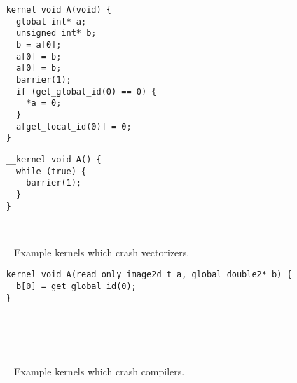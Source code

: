 \newsavebox{\XeonPhiSegfault}
\begin{lrbox}{\XeonPhiSegfault}
  \hspace{1.5em}
  \begin{lstlisting}
    kernel void A(void) {
      global int* a;
      unsigned int* b;
      b = a[0];
      a[0] = b;
      a[0] = b;
      barrier(1);
      if (get_global_id(0) == 0) {
        *a = 0;
      }
      a[get_local_id(0)] = 0;
    }
  \end{lstlisting}
\end{lrbox}


\newsavebox{\IntelVectorizerSegfault}
\begin{lrbox}{\IntelVectorizerSegfault}
  \hspace{1.5em}
  \begin{lstlisting}
    __kernel void A() {
      while (true) {
        barrier(1);
      }
    }
  \end{lstlisting}
\end{lrbox}

\begin{figure}
  \centering
  \\%
  \caption{Example kernels which crash vectorizers.}%
  \label{lst:vectorizer-crashes}%
\end{figure}

\newsavebox{\IntelGtDoubleAssertion}
\begin{lrbox}{\IntelGtDoubleAssertion}
  \hspace{1.5em}
  \begin{lstlisting}
    kernel void A(read_only image2d_t a, global double2* b) {
      b[0] = get_global_id(0);
    }
  \end{lstlisting}
\end{lrbox}

\begin{figure}
  \centering %
  \\%
  \\%
  \\%
  \caption{Example kernels which crash compilers.}%
  \label{lst:compiler-crashes}%
\end{figure}

